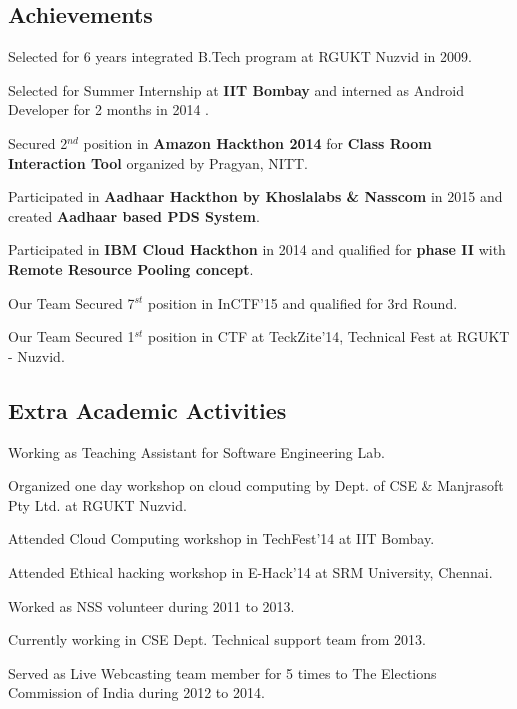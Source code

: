 \documentclass[10pt]{article}
\begin{document}
\subsection*{Achievements }
\onehalfspacing
\begin{compactitem}
	\item Selected for 6 years integrated B.Tech program at RGUKT Nuzvid in 2009.
	\item Selected for Summer Internship at \textbf{IIT Bombay} and interned as Android Developer for 2 months in 2014 .
	\item Secured 2$ ^{nd} $ position in \textbf{Amazon Hackthon 2014} for \textbf{Class Room Interaction Tool} organized by Pragyan, NITT.
	\item Participated in \textbf{Aadhaar Hackthon by Khoslalabs \& Nasscom} in 2015 and created \textbf{Aadhaar based PDS System}.
	\item Participated in \textbf{IBM Cloud Hackthon} in 2014 and qualified for \textbf{phase II} with \textbf{Remote Resource Pooling concept}.
	\item Our Team Secured 7$^{st}$ position in InCTF'15 and qualified for 3rd Round.
	\item Our Team Secured 1$^{st}$ position in CTF at TeckZite'14, Technical Fest at RGUKT - Nuzvid.
\end{compactitem}

\subsection*{Extra Academic Activities}
\onehalfspacing
\begin{compactitem}
	\item Working as Teaching Assistant for Software Engineering Lab.
	\item Organized one day workshop on cloud computing by Dept. of CSE \& Manjrasoft Pty Ltd. at RGUKT Nuzvid.
	\item Attended Cloud Computing workshop in TechFest'14 at IIT Bombay. 
	\item Attended Ethical hacking workshop in E-Hack'14 at SRM University, Chennai.
	\item Worked as NSS volunteer during 2011 to 2013.
	\item Currently working in CSE Dept. Technical support team from 2013. 
	\item Served as Live Webcasting team member for 5 times to The Elections Commission of India during 2012 to 2014.
\end{compactitem}
\end{document}
